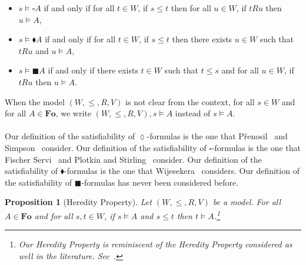 \documentclass[draft]{article}
\newtheorem{proposition}{Proposition}
\def\Fo{\mathbf{Fo}}
\begin{document}
\begin{itemize}
%
%
%
%
\item $s{\models}{\square}A$ if and only if for all $t{\in}W$, if $s{\leq}t$ then for all $u{\in}W$, if $t{R}u$ then $u{\models}A$,
%
%
%
%
\item $s{\models}{\blacklozenge}A$ if and only if for all $t{\in}W$, if $s{\leq}t$ then there exists $u{\in}W$ such that $t{R}u$ and $u{\models}A$,
%
%
%
%
\item $s{\models}{\blacksquare}A$ if and only if there exists $t{\in}W$ such that $t{\leq}s$ and for all $u{\in}W$, if $t{R}u$ then $u{\models}A$.
%
%
%
%
\end{itemize}
%
%
When the model $(W,{\leq},{R},V)$ is not clear from the context, for all $s{\in}W$ and for all $A{\in}\Fo$, we write $(W,{\leq},{R},V),s{\models}A$ instead of $s{\models}A$.
%
%
\\
\\
%
%
Our definition of the satisfiability of $\lozenge$-formulas is the one that P\v{r}enosil~\cite{Prenosil:2014} and Simpson~\cite[Page~$49$]{Simpson:1994} consider.
Our definition of the satisfiability of $\square$-formulas is the one that Fischer Servi~\cite{FischerServi:1984} and Plotkin and Stirling~\cite{Plotkin:Stirling:1986} consider.
Our definition of the satisfiability of $\blacklozenge$-formulas is the one that Wijesekera~\cite{Wijesekera:1990} considers.
Our definition of the satisfiability of $\blacksquare$-formulas has never been considered before.
%
%
\begin{proposition}[Heredity Property]\label{Proposition:let:be:a:model:for:all:formulas:and:for:all:if:and:then}
%
%
Let $(W,{\leq},{R},V)$ be a model.
For all $A{\in}\Fo$ and for all $s,t{\in}W$, if $s{\models}A$ and $s{\leq}t$ then $t{\models}A$.\footnote{Our Heredity Property is reminiscent of the Heredity Property considered as well in the literature.
See~\cite[Proposition~$2.1$]{Chagrov:Zakharyaschev:1997}.}
%
%
\end{proposition}
\end{document}
